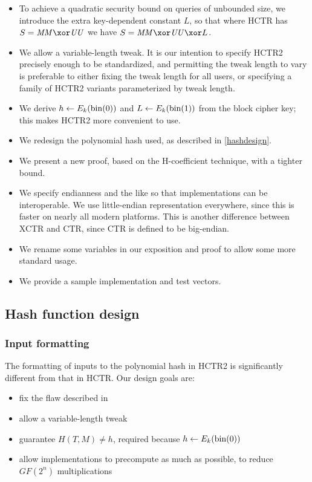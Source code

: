 \documentclass[hctr.tex]{subfiles}
\begin{document}
\begin{itemize}
    \item To achieve a quadratic security bound
    on queries of unbounded size,
    we introduce the extra
    key-dependent constant \(L\),
    so that where HCTR has \(S = \MM \xor \UU\)
    we have \(S = \MM \xor \UU \xor L\).
    \item We allow a variable-length tweak. It is our intention to specify
    HCTR2 precisely enough to be standardized, and permitting the tweak length
    to vary is preferable to either fixing the tweak length for all users,
    or specifying a family of HCTR2 variants parameterized by tweak length.
    \item We derive \(h \gets E_k(\operatorname{bin}(0))\)
    and \(L \gets E_k(\operatorname{bin}(1))\) from the block cipher key;
    this makes HCTR2 more convenient to use.
    \item We redesign the polynomial hash used, as described in
    \autoref{hashdesign}.
    \item We present a new proof, based on the H-coefficient technique,
    with a tighter bound.
    \item We specify endianness and the like so that implementations can be interoperable. We use little-endian representation everywhere,
    since this is faster on nearly all modern platforms.
    This is another difference between XCTR and CTR, since
    CTR is defined to be big-endian.
    \item We rename some variables in our exposition and proof to allow some more standard usage.
    \item We provide a sample implementation and test vectors.
\end{itemize}

\subsection{Hash function design}\label{hashdesign}

\subsubsection{Input formatting}

The formatting of inputs to the polynomial hash in HCTR2 is significantly
different from that in HCTR. Our design goals are:

\begin{itemize}
    \item fix the flaw described in \cite{kumarhctr}
    \item allow a variable-length tweak
    \item guarantee \(H(T, M) \neq h\), required
    because \(h \gets E_k(\operatorname{bin}(0))\)
    \item allow implementations to precompute as much as possible, to reduce \(GF(2^n)\) multiplications
\end{itemize}
\end{document}

